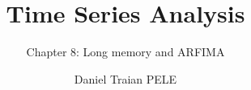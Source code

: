 \title[Time Series Analysis]{Time Series Analysis}
\subtitle{Chapter 8: Long memory and ARFIMA}
\author[D.T. Pele]{Daniel Traian PELE}
\date{}

\providecommand{\tsaapplink}[3]{\hypertarget{#2}{}\hyperlink{#1}{\beamergotobutton{#3}}}  %
\providecommand{\tsaappback}[2]{\begin{tikzpicture}[remember picture,overlay]\node[anchor=south east] at ([xshift=-3mm,yshift=7mm]current page.south east){\hyperlink{#1}{\beamerreturnbutton{#2}}};\end{tikzpicture}}  %
\providecommand{\tsachlink}[2]{\href{#1}{#2}}  %
\providecommand{\tsachlinkt}[2]{\href{#1}{\usebeamercolor[fg]{frametitle}#2}}  %


